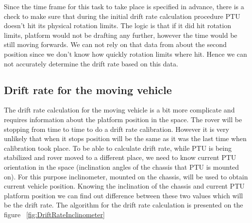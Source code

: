 Since the time frame for this task to take place is specified in advance, there is a check to make sure that during the initial drift rate calculation procedure PTU doesn't hit its physical rotation limits. The logic is that if it did hit rotation limits, platform would not be drafting any further, however the time would be still moving forwards. We can not rely on that data from about the second position since we don't know how quickly rotation limits where hit. Hence we can not accurately determine the drift rate based on this data.

\subsection{Drift rate for the moving vehicle}
The drift rate calculation for the moving vehicle is a bit more complicate and requires information about the platform position in the space. The rover will be stopping from time to time to do a drift rate calibration. However it is very unlikely that when it stops position will be the same as it was the last time when calibration took place. To be able to calculate drift rate, while PTU is being stabilized and rover moved to a different place, we need to know current PTU orientation in the space (inclination angles of the chassis that PTU is mounted on). For this purpose inclinometer, mounted on the chassis, will be used to obtain current vehicle position. Knowing the inclination of the chassis and current PTU platform position we can find out difference between these two values which will be the drift rate. The algorithm for the drift rate calculation is presented on the figure ~\ref{fig:DriftRateInclinometer}


